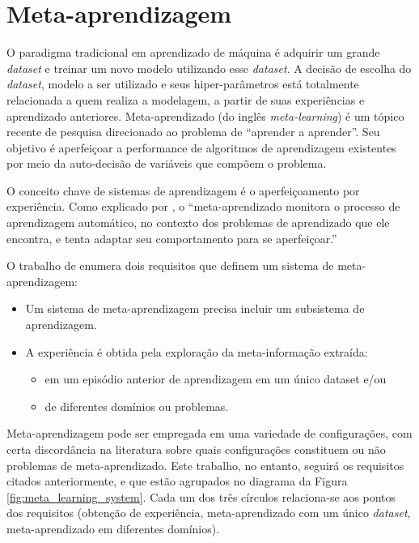 \documentclass[
12pt,				%
openright,			%
oneside,			%
a4paper,			%
english,			%
french,				%
spanish,			%
brazil				%
]{abntex2}
\begin{document}
\section{Meta-aprendizagem} \label{metaaprendizagem}

O paradigma tradicional em aprendizado de máquina é adquirir um grande \textit{dataset} e treinar um novo modelo utilizando esse \textit{dataset}. A decisão de escolha do \textit{dataset}, modelo a ser utilizado e seus hiper-parâmetros está totalmente relacionada a quem realiza a modelagem, a partir de suas experiências e aprendizado anteriores. Meta-aprendizado (do inglês \textit{meta-learning}) é um tópico recente de pesquisa direcionado ao problema de ``aprender a aprender''. Seu objetivo é aperfeiçoar a performance de algoritmos de aprendizagem existentes por meio da auto-decisão de variáveis que compõem o problema.

O conceito chave de sistemas de aprendizagem é o aperfeiçoamento por experiência. Como explicado por , o ``meta-aprendizado monitora o processo de aprendizagem automático, no contexto dos problemas de aprendizado que ele encontra, e tenta adaptar seu comportamento para se aperfeiçoar.''

O trabalho de  enumera dois requisitos que definem um sistema de meta-aprendizagem:

\begin{itemize}
    \item Um sistema de meta-aprendizagem precisa incluir um subsistema de aprendizagem.
    \item A experiência é obtida pela exploração da meta-informação extraída:
    \begin{itemize}
        \item em um episódio anterior de aprendizagem em um único dataset e/ou
        \item de diferentes domínios ou problemas.
    \end{itemize}
\end{itemize}

Meta-aprendizagem pode ser empregada em uma variedade de configurações, com certa discordância na literatura sobre quais configurações constituem ou não problemas de meta-aprendizado. Este trabalho, no entanto, seguirá  os requisitos citados anteriormente, e que estão agrupados no diagrama da Figura \ref{fig:meta_learning_system}. Cada um dos três círculos relaciona-se aos pontos dos requisitos (obtenção de experiência, meta-aprendizado com um único \textit{dataset}, meta-aprendizado em diferentes domínios).
\end{document}
